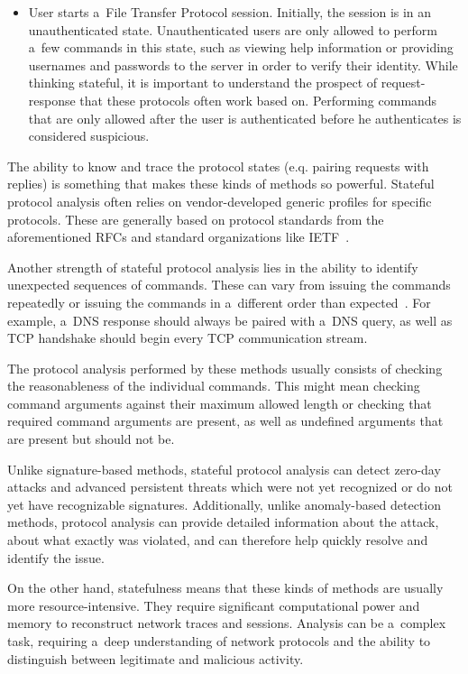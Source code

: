 \documentclass[
  printed,     %
  color,       %
  oneside,     %
  nosansbold,  %
  nocolorbold, %
  nolof,         %
  nolot,         %
]{fithesis4}
\begin{document}
\begin{itemize}
    \item User starts a~File Transfer Protocol session. Initially, the session is in an unauthenticated state. Unauthenticated users are only allowed to perform a~few commands in this state, such as viewing help information or providing usernames and passwords to the server in order to verify their identity. While thinking stateful, it is important to understand the prospect of request-response that these protocols often work based on. Performing commands that are only allowed after the user is authenticated before he authenticates is considered suspicious.
\end{itemize}

The ability to know and trace the protocol states (e.q. pairing requests with replies) is something that makes these kinds of methods so powerful. Stateful protocol analysis often relies on vendor-developed generic profiles for specific protocols. These are generally based on protocol standards from the aforementioned RFCs and standard organizations like IETF~\cite{LIAO201316}.

Another strength of stateful protocol analysis lies in the ability to identify unexpected sequences of commands. These can vary from issuing the commands repeatedly or issuing the commands in a~different order than expected~\cite{gtidaps}. For example, a~DNS response should always be paired with a~DNS query, as well as TCP handshake should begin every TCP communication stream.

The protocol analysis performed by these methods usually consists of checking the reasonableness of the individual commands. This might mean checking command arguments against their maximum allowed length or checking that required command arguments are present, as well as undefined arguments that are present but should not be.

Unlike signature-based methods, stateful protocol analysis can detect zero-day attacks and advanced persistent threats which were not yet recognized or do not yet have recognizable signatures. Additionally, unlike anomaly-based detection methods, protocol analysis can provide detailed information about the attack, about what exactly was violated, and can therefore help quickly resolve and identify the issue.

On the other hand, statefulness means that these kinds of methods are usually more resource-intensive. They require significant computational power and memory to reconstruct network traces and sessions. Analysis can be a~complex task, requiring a~deep understanding of network protocols and the ability to distinguish between legitimate and malicious activity.
\end{document}
